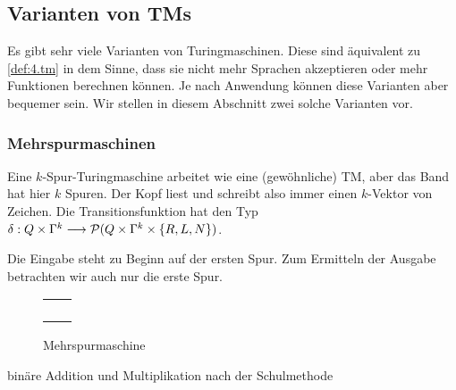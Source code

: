 \subsection{Varianten von \ac{TM}s}
Es gibt sehr viele Varianten von Turingmaschinen.
Diese sind äquivalent zu \autoref{def:4.tm} in dem Sinne, dass sie nicht mehr Sprachen akzeptieren oder mehr Funktionen berechnen können.
Je nach Anwendung können diese Varianten aber bequemer sein. Wir stellen in diesem Abschnitt zwei solche Varianten vor.


\subsubsection{Mehrspurmaschinen}

Eine $k$-Spur-Turingmaschine arbeitet wie eine (gewöhnliche) \ac{TM}, aber das Band hat hier $k$ Spuren.
Der Kopf liest und schreibt also immer einen $k$-Vektor von Zeichen.
Die Transitionsfunktion hat den Typ $\delta: Q\times\Gamma^k\--> \Powerset(Q\times\Gamma^k\times\{R,L,N\})$.

Die Eingabe steht zu Beginn auf der ersten Spur.
Zum Ermitteln der Ausgabe betrachten wir auch nur die erste Spur.

	\begin{figure}[H]\centering
		{\renewcommand{\arraystretch}{0.8}
		\begin{tabu} to .5\textwidth {X[.35]|X[.65]}
			&\\\hline
			&\\\hline
			&\\\hline
			&\\\hline
			&
		\end{tabu}}
		\caption{Mehrspurmaschine}
	\end{figure}

	\begin{Bsp*}
		binäre Addition und Multiplikation nach der Schulmethode
	\end{Bsp*}


